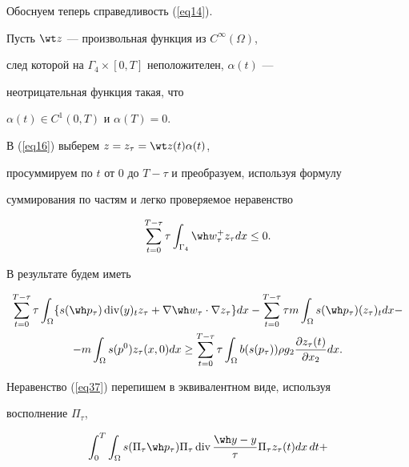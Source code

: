 \begin{pf}
Обоснуем теперь справедливость (\ref{eq14}).


Пусть $\wt z$ --- произвольная функция из $C^{\infty}(\Omega)$,


след которой на $\Gamma_{4} \times[0,T]$ неположителен, $\alpha(t)$ ---


неотрицательная функция такая, что


$\alpha(t) \in C^{1}(0,T)$ и $\alpha(T)=0$.


В (\ref{eq16}) выберем $z= z_{\tau} = \wt z(t) \alpha(t)$,


просуммируем по $t$ от 0 до $T-\tau$ и преобразуем, используя формулу


суммирования по частям и легко проверяемое неравенство


$$


\sum_{t=0}^{T-\tau} \tau \int 


_{\Gamma_{4}} \wh w_{\tau}^{+} z_{\tau} dx \leq 0.


$$


В результате будем иметь


\begin{multline}


\sum_{t=0}^{T-\tau} \tau \int_{\Omega} \{s(\wh p_{\tau})


\Div (y)_{t} z_{\tau} + \nabla \wh w_{\tau} \cdot \nabla z_{\tau} \}


dx - \sum_{t=0}^{T-\tau} \tau m \int_{\Omega}


s(\wh p_{\tau}) (z_{\tau})_{t} dx - \\


%


- m \int_{\Omega} s(p^{0}) z_{\tau}(x,0) dx \geq 


\sum_{t=0}^{T-\tau} \tau \int_{\Omega} 


b(s(p_{\tau})) \rho g_{2} \frac{\partial z_{\tau}(t)}{\partial x_{2}} dx.


\label{eq37}


\end{multline}


Неравенство (\ref{eq37}) перепишем в эквивалентном виде, используя


восполнение $\Pi_{\tau}$,


\begin{multline}


\int_{0}^{T} \int_{\Omega} s (\Pi_{\tau}


\wh p_{\tau} ) \Pi_{\tau} \Div 


\frac{\wh y - y}{\tau} \Pi_{\tau}z_{\tau}(t) dx\,dt + \\



\end{multline}
\end{pf}
